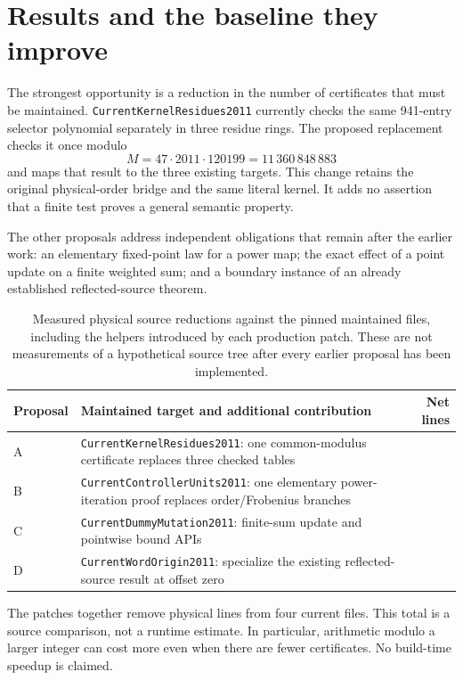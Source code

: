 \documentclass[11pt,letterpaper]{article}
\newcommand{\code}[1]{\nolinkurl{#1}}
\begin{document}
\section{Results and the baseline they improve}

The strongest opportunity is a reduction in the number of certificates that must be maintained. \code{CurrentKernelResidues2011} currently checks the same 941-entry selector polynomial separately in three residue rings. The proposed replacement checks it once modulo
\[
 M=47\cdot2011\cdot120199=11\,360\,848\,883
\]
and maps that result to the three existing targets. This change retains the original physical-order bridge and the same literal kernel. It adds no assertion that a finite test proves a general semantic property.

The other proposals address independent obligations that remain after the earlier work: an elementary fixed-point law for a power map; the exact effect of a point update on a finite weighted sum; and a boundary instance of an already established reflected-source theorem.

\begin{table}[ht]
\centering\small
\begin{tabularx}{\textwidth}{@{}l X r@{}}
\toprule
Proposal & Maintained target and additional contribution & Net lines\\
\midrule
A & \code{CurrentKernelResidues2011}: one common-modulus certificate replaces three checked tables & \CommonSaved{}\\
B & \code{CurrentControllerUnits2011}: one elementary power-iteration proof replaces order/Frobenius branches & \PowerSaved{}\\
C & \code{CurrentDummyMutation2011}: finite-sum update and pointwise bound APIs & \UpdateSaved{}\\
D & \code{CurrentWordOrigin2011}: specialize the existing reflected-source result at offset zero & \OriginSaved{}\\
\bottomrule
\end{tabularx}
\caption{Measured physical source reductions against the pinned maintained files, including the helpers introduced by each production patch. These are not measurements of a hypothetical source tree after every earlier proposal has been implemented.}
\end{table}

The patches together remove \TotalSaved{} physical lines from four current files. This total is a source comparison, not a runtime estimate. In particular, arithmetic modulo a larger integer can cost more even when there are fewer certificates. No build-time speedup is claimed.
\end{document}
